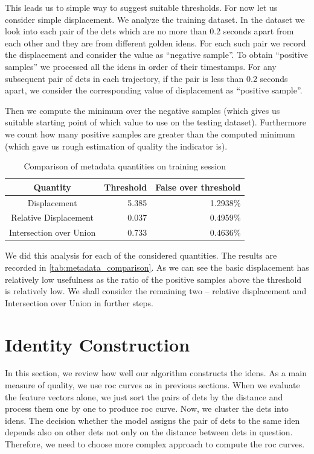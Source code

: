This leads us to simple way to suggest suitable thresholds. For now let us consider simple displacement. We analyze the training dataset. In the dataset we look into each pair of the \glspl{det} which are no more than 0.2 seconds apart from each other and they are from different golden \glspl{iden}. For each such pair we record the displacement and consider the value as ``negative sample''. To obtain ``positive samples'' we processed all the \glspl{iden} in order of their timestamps. For any subsequent pair of \glspl{det} in each trajectory, if the pair is less than 0.2 seconds apart, we consider the corresponding value of displacement as ``positive sample''.

Then we compute the minimum over the negative samples (which gives us suitable starting point of which value to use on the testing dataset). Furthermore we count how many positive samples are greater than the computed minimum (which gave us rough estimation of quality the indicator is).

\begin{table}
    \centering
    \begin{tabular}{c|r|r}
         Quantity & Threshold & False over threshold  \\ \hline
         Displacement & 5.385 & 1.2938\% \\
         Relative Displacement & 0.037 & 0.4959\% \\
         Intersection over Union & 0.733 & 0.4636\%
    \end{tabular}
    \caption{Comparison of metadata quantities on training session}
    \label{tab:metadata_comparison}
\end{table}

We did this analysis for each of the considered quantities. The results are recorded in \autoref{tab:metadata_comparison}. As we can see the basic displacement has relatively low usefulness as the ratio of the positive samples above the threshold is relatively low. We shall consider the remaining two -- relative displacement and Intersection over Union in further steps.

\section{Identity Construction}

In this section, we review how well our algorithm constructs the \glspl{iden}. As a main measure of quality, we use \gls{roc} curves as in previous sections. When we evaluate the feature vectors alone, we just sort the pairs of \glspl{det} by the distance and process them one by one to produce \gls{roc} curve. Now, we cluster the \glspl{det} into \glspl{iden}. The decision whether the model assigns the pair of \glspl{det} to the same \gls{iden} depends also on other \glspl{det} not only on the distance between \glspl{det} in question. Therefore, we need to choose more complex approach to compute the \gls{roc} curves.

